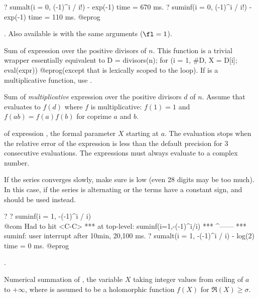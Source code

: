 ? sumalt(i = 0, (-1)^i / i!) - exp(-1)
time = 670 ms.
? suminf(i = 0, (-1)^i / i!) - exp(-1)
time = 110 ms.
@eprog

. Also
available is  with the same arguments ($\fl = 1$).

\label{se:sumdiv}
Sum of expression  over the positive divisors of $n$.
This function is a trivial wrapper essentially equivalent to
\bprog
  D = divisors(n);
  for (i = 1, #D, X = D[i]; eval(expr))
@eprog\noindent (except that  is lexically scoped to the 
loop). If  is a multiplicative function, use .

\label{se:sumdivmult}
Sum of \emph{multiplicative} expression  over the positive
divisors $d$ of $n$. Assume that  evaluates to $f(d)$
where $f$ is multiplicative: $f(1) = 1$ and $f(ab) = f(a)f(b)$ for coprime
$a$ and $b$.

\label{se:suminf}
 of expression
, the formal parameter $X$ starting at $a$. The evaluation stops
when the relative error of the expression is less than the default precision
for 3 consecutive evaluations. The expressions must always evaluate to a
complex number.

If the series converges slowly, make sure  is low (even 28
digits may be too much). In this case, if the series is alternating or the
terms have a constant sign,  and  should be used
instead.

\bprog
? 
? suminf(i = 1, -(-1)^i / i)   \\@com Had to hit <C-C>
  ***   at top-level: suminf(i=1,-(-1)^i/i)
  ***                                ^------
  *** suminf: user interrupt after 10min, 20,100 ms.
? sumalt(i = 1, -(-1)^i / i) - log(2)
time = 0 ms.
@eprog

.

\label{se:sumnum}
Numerical summation of , the variable $X$ taking integer values
from ceiling of $a$ to $+\infty$, where  is assumed to be a
holomorphic function $f(X)$ for $\Re(X)\ge \sigma$.

